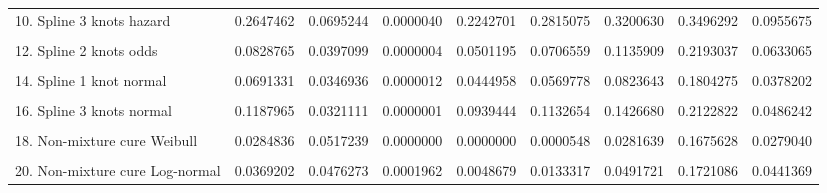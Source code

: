 \documentclass[
]{article}
\begin{document}
\begin{table}
{\begin{tabular}[t]{lrrrrrrrr}
10. Spline 3 knots hazard & 0.2647462 & 0.0695244 & 0.0000040 & 0.2242701 & 0.2815075 & 0.3200630 & 0.3496292 & 0.0955675\\
\cellcolor{gray!6}{11. Spline 1 knot odds} & \cellcolor{gray!6}{0.0602411} & \cellcolor{gray!6}{0.0377592} & \cellcolor{gray!6}{0.0004612} & \cellcolor{gray!6}{0.0331939} & \cellcolor{gray!6}{0.0461392} & \cellcolor{gray!6}{0.0743684} & \cellcolor{gray!6}{0.1809483} & \cellcolor{gray!6}{0.0410604}\\
12. Spline 2 knots odds & 0.0828765 & 0.0397099 & 0.0000004 & 0.0501195 & 0.0706559 & 0.1135909 & 0.2193037 & 0.0633065\\
\cellcolor{gray!6}{13. Spline 3 knots odds} & \cellcolor{gray!6}{0.0939157} & \cellcolor{gray!6}{0.0420897} & \cellcolor{gray!6}{0.0000060} & \cellcolor{gray!6}{0.0582390} & \cellcolor{gray!6}{0.0823349} & \cellcolor{gray!6}{0.1258458} & \cellcolor{gray!6}{0.2118616} & \cellcolor{gray!6}{0.0674258}\\
14. Spline 1 knot normal & 0.0691331 & 0.0346936 & 0.0000012 & 0.0444958 & 0.0569778 & 0.0823643 & 0.1804275 & 0.0378202\\
\cellcolor{gray!6}{15. Spline 2 knots normal} & \cellcolor{gray!6}{0.0932147} & \cellcolor{gray!6}{0.0319733} & \cellcolor{gray!6}{0.0000000} & \cellcolor{gray!6}{0.0680516} & \cellcolor{gray!6}{0.0850118} & \cellcolor{gray!6}{0.1161592} & \cellcolor{gray!6}{0.2005412} & \cellcolor{gray!6}{0.0479871}\\
16. Spline 3 knots normal & 0.1187965 & 0.0321111 & 0.0000001 & 0.0939444 & 0.1132654 & 0.1426680 & 0.2122822 & 0.0486242\\
\cellcolor{gray!6}{17. Mixture cure Weibull} & \cellcolor{gray!6}{0.0274205} & \cellcolor{gray!6}{0.0519801} & \cellcolor{gray!6}{0.0000000} & \cellcolor{gray!6}{0.0000000} & \cellcolor{gray!6}{0.0000059} & \cellcolor{gray!6}{0.0191609} & \cellcolor{gray!6}{0.1672892} & \cellcolor{gray!6}{0.0189217}\\
18. Non-mixture cure Weibull & 0.0284836 & 0.0517239 & 0.0000000 & 0.0000000 & 0.0000548 & 0.0281639 & 0.1675628 & 0.0279040\\
\cellcolor{gray!6}{19. Mixture cure Log-normal} & \cellcolor{gray!6}{0.0386248} & \cellcolor{gray!6}{0.0496451} & \cellcolor{gray!6}{0.0001478} & \cellcolor{gray!6}{0.0035974} & \cellcolor{gray!6}{0.0128314} & \cellcolor{gray!6}{0.0569406} & \cellcolor{gray!6}{0.1684663} & \cellcolor{gray!6}{0.0533108}\\
20. Non-mixture cure Log-normal & 0.0369202 & 0.0476273 & 0.0001962 & 0.0048679 & 0.0133317 & 0.0491721 & 0.1721086 & 0.0441369\\

\end{tabular}}
\end{table}
\end{document}
